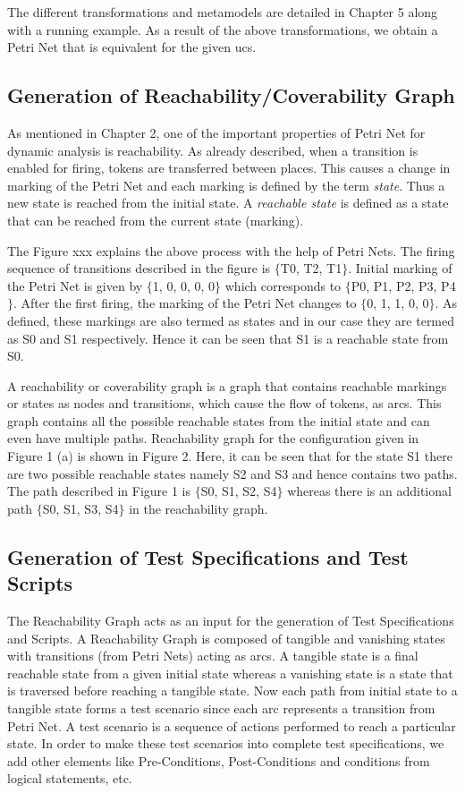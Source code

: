 The different transformations and metamodels are detailed in Chapter 5 along with a running example. As a result of the above transformations, we obtain a Petri Net that is equivalent for the given \gls{ucs}.

\subsection{Generation of Reachability/Coverability Graph}
As mentioned in Chapter 2, one of the important properties of Petri Net for dynamic analysis is reachability. As already described, when a transition is enabled for firing, tokens are transferred between places. This causes a change in marking of the Petri Net and each marking is defined by the term \textit{state}. Thus a new state is reached from the initial state. A \textit{reachable state} is defined as a state that can be reached from the current state (marking).

The Figure xxx explains the above process with the help of Petri Nets. The firing sequence of transitions described in the figure is $ \lbrace $T0, T2, T1$ \rbrace $. Initial marking of the Petri Net is given by $ \lbrace $1, 0, 0, 0, 0$ \rbrace $ which corresponds to $ \lbrace $P0, P1, P2, P3, P4$ \rbrace $. After the first firing, the marking of the Petri Net changes to $ \lbrace $0, 1, 1, 0, 0$ \rbrace $. As defined, these markings are also termed as states and in our case they are termed as S0 and S1 respectively. Hence it can be seen that S1 is a reachable state from S0.

A reachability or coverability graph is a graph that contains reachable markings or states as nodes and transitions, which cause the flow of tokens, as arcs. This graph contains all the possible reachable states from the initial state and can even have multiple paths. Reachability graph for the configuration given in Figure 1 (a) is shown in Figure 2. Here, it can be seen that for the state S1 there are two possible reachable states namely S2 and S3 and hence contains two paths. The path described in Figure 1 is $ \lbrace $S0, S1, S2, S4$ \rbrace $ whereas there is an additional path $ \lbrace $S0, S1, S3, S4$ \rbrace $ in the reachability graph.


\subsection{Generation of Test Specifications and Test Scripts}
The Reachability Graph acts as an input for the generation of Test Specifications and Scripts. A Reachability Graph is composed of tangible and vanishing states with transitions (from Petri Nets) acting as arcs. A tangible state is a final reachable state from a given initial state whereas a vanishing state is a state that is traversed before reaching a tangible state. Now each path from initial state to a tangible state forms a test scenario since each arc represents a transition from Petri Net. A test scenario is a sequence of actions performed to reach a particular state. In order to make these test scenarios into complete test specifications, we add other elements like Pre-Conditions, Post-Conditions and conditions from logical statements, etc. 

